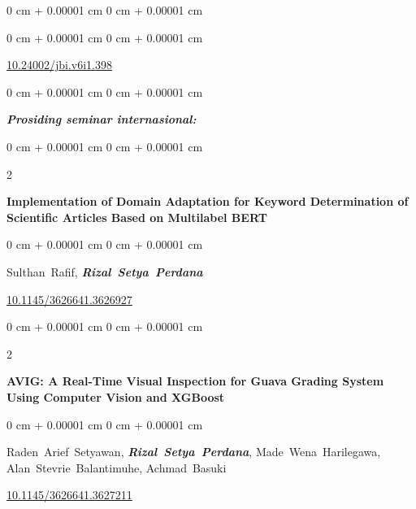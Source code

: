\documentclass[10pt, letterpaper]{article}
\newenvironment{onecolentry}{
    \begin{adjustwidth}{
        0 cm + 0.00001 cm
    }{
        0 cm + 0.00001 cm
    }
}{
    \end{adjustwidth}
} %
\newenvironment{twocolentry}[2][]{
    \onecolentry
    \def\secondColumn{#2}
    \setcolumnwidth{\fill, 4.5 cm}
    \begin{paracol}{2}
}{
    \switchcolumn \raggedleft \secondColumn
    \end{paracol}
    \endonecolentry
} %
\begin{document}
\begin{onecolentry}
\begin{samepage}
\begin{onecolentry}
                \href{https://doi.org/10.24002/jbi.v6i1.398}{10.24002/jbi.v6i1.398}
            \end{onecolentry}
        \end{samepage}

        
        \vspace{0.5 cm}    
            
        \end{onecolentry}
        \begin{onecolentry}
            \textit{\textbf{Prosiding seminar internasional:}}
        \end{onecolentry}
        \vspace{0.50 cm}
         \begin{samepage}
            \begin{twocolentry}{2023}
                \textbf{Implementation of Domain Adaptation for Keyword Determination of Scientific Articles Based on Multilabel BERT}
            \end{twocolentry}
            \vspace{0.10 cm}
            \begin{onecolentry}
                \mbox{Sulthan Rafif}, \mbox{\textbf{\textit{Rizal Setya Perdana}}}
                \vspace{0.10 cm}
                
                \href{https://doi.org/10.1145/3626641.3626927}{10.1145/3626641.3626927}
            \end{onecolentry}
        \end{samepage}
        \vspace{0.3 cm}
        \begin{samepage}
            \begin{twocolentry}{2023}
                \textbf{AVIG: A Real-Time Visual Inspection for Guava Grading System Using Computer Vision and XGBoost}
            \end{twocolentry}
            \vspace{0.10 cm}
            \begin{onecolentry}
                \mbox{Raden Arief Setyawan}, \mbox{\textbf{\textit{Rizal Setya Perdana}}},
                \mbox{Made Wena Harilegawa},
                \mbox{Alan Stevrie Balantimuhe},
                \mbox{Achmad Basuki}
                \vspace{0.10 cm}
                
                \href{https://doi.org/10.1145/3626641.3627211}{10.1145/3626641.3627211}
            \end{onecolentry}
        \end{samepage}
\end{document}

